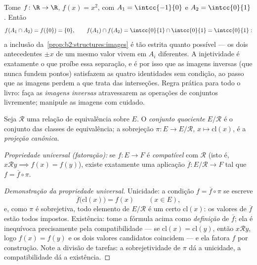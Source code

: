 \begin{example}\label{ex:b2:structures:imagestrict}
Tome $f \colon \R \to \R$, $f(x) = x^2$, com $A_1 =
\intcc{-1}{0}$ e $A_2 = \intcc{0}{1}$. Então
\[
f(A_1 \cap A_2) = f(\{0\}) = \{0\},
\qquad
f(A_1) \cap f(A_2) = \intcc{0}{1} \cap \intcc{0}{1} =
\intcc{0}{1} :
\]
a inclusão da~\cref{prop:b2:structures:images} é tão estrita
quanto possível --- os dois antecedentes $\pm x$ de um mesmo valor
vivem em $A_i$ diferentes. A injetividade é exatamente o que
proíbe essa separação, e é por isso que as imagens inversas (que
nunca fundem pontos) satisfazem as quatro identidades sem condição,
ao passo que as imagens perdem a que trata das interseções. Regra
prática para todo o livro: faça as \emph{imagens inversas}
atravessarem as operações de conjuntos livremente; manipule as
imagens com cuidado.
\end{example}

\begin{definition}\label{def:b2:structures:quotient}
Seja $\mathcal{R}$ uma relação de equivalência sobre $E$. O
\emph{conjunto quociente} $E/\mathcal{R}$ é o conjunto das
classes de equivalência; a sobrejeção $\pi \colon E \to E/\mathcal{R}$,
$x \mapsto \mathrm{cl}(x)$, é a \emph{projeção
canônica}.

\emph{Propriedade universal (fatoração):} se $f \colon E \to F$ é
\emph{compatível} com $\mathcal{R}$ (isto é, $x \mathbin{\mathcal{R}}
y \implies f(x) = f(y)$), existe exatamente uma aplicação $\overline f
\colon E/\mathcal{R} \to F$ tal que $f = \overline f \circ \pi$.
\end{definition}

\begin{proof}[Demonstração da propriedade universal]
Unicidade: a condição $f = \overline f \circ \pi$ se escreve
\[
\overline f\bigl(\mathrm{cl}(x)\bigr) = f(x)
\qquad (x \in E),
\]
e, como $\pi$ é sobrejetiva, todo elemento de
$E/\mathcal{R}$ é um certo $\mathrm{cl}(x)$: os valores de
$\overline f$ estão todos impostos. Existência: tome a fórmula acima como
\emph{definição} de $\overline f$; ela é inequívoca
precisamente pela compatibilidade --- se $\mathrm{cl}(x) =
\mathrm{cl}(y)$, então $x \mathbin{\mathcal{R}} y$, logo $f(x) =
f(y)$ e os dois valores candidatos coincidem --- e ela fatora
$f$ por construção. Note a divisão de tarefas: a sobrejetividade
de $\pi$ dá a unicidade, a compatibilidade dá a existência.
\end{proof}

